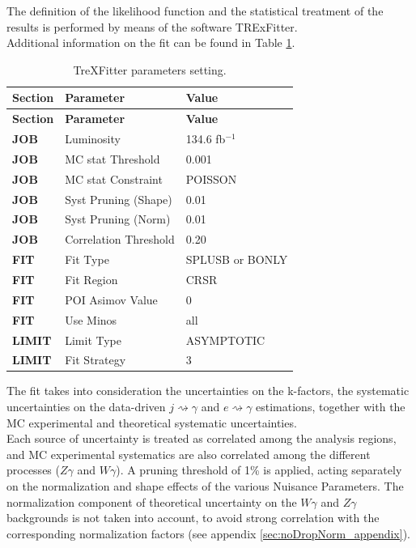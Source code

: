 \noindent
The definition of the likelihood function and the statistical treatment of the results is performed by means of the software TRExFitter. \\
Additional information on the fit can be found in Table \ref{tab: trex}. 
\begin{longtable}{l|l|p{5cm}}
\caption{TreXFitter parameters setting.}
\label{tab: trex}\\
\hline
\textbf{Section} & \textbf{Parameter} & \textbf{Value} \\
\hline
\endfirsthead
\hline
\textbf{Section} & \textbf{Parameter} & \textbf{Value} \\
\hline
\endhead

\hline
\endfoot

\hline
\endlastfoot


\textbf{JOB} & Luminosity & 134.6 fb$^{-1}$ \\
\textbf{JOB} & MC stat Threshold & 0.001 \\
\textbf{JOB} & MC stat Constraint & POISSON \\
\textbf{JOB} & Syst Pruning (Shape) & 0.01 \\
\textbf{JOB} & Syst Pruning (Norm) & 0.01 \\
\textbf{JOB} & Correlation Threshold & 0.20 \\
\textbf{FIT} & Fit Type & SPLUSB or BONLY \\
\textbf{FIT} & Fit Region & CRSR \\
\textbf{FIT} & POI Asimov Value & 0 \\
\textbf{FIT} & Use Minos & all \\
\textbf{LIMIT} & Limit Type & ASYMPTOTIC \\
\textbf{LIMIT} & Fit Strategy & 3 \\

\end{longtable}

The fit takes into consideration the uncertainties on the k-factors, the systematic uncertainties on the data-driven $j \rightsquigarrow \gamma$ and $e \rightsquigarrow \gamma$ estimations, together with the MC experimental and theoretical systematic uncertainties. \\
Each source of uncertainty is treated as correlated among the analysis regions, and MC experimental systematics are also correlated among the different processes ($Z\gamma$ and $W\gamma$). A pruning threshold of 1\% is applied, acting separately on the normalization and shape effects of the various Nuisance Parameters. The normalization component of theoretical uncertainty on the $W\gamma$ and $Z\gamma$ backgrounds is not taken into account, to avoid strong correlation with the corresponding normalization factors (see appendix \ref{sec:noDropNorm_appendix}).\\
